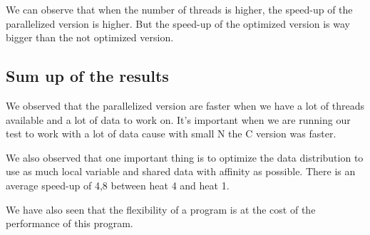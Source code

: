 \documentclass{report}
\begin{document}
We can observe that when the number of threads is higher, the speed-up of the parallelized version is higher. But the speed-up of the optimized version is way bigger than the not optimized version.

\subsection{Sum up of the results}

We observed that the parallelized version are faster when we have a lot of threads available and a lot of data to work on. It's important when we are running our test to work with a lot of data cause with small N the C version was faster. 

We also observed that one important thing is to optimize the data distribution to use as much local variable and shared data with affinity as possible. There is an average speed-up of 4,8 between heat 4 and heat 1.

We have also seen that the flexibility of a program is at the cost of the performance of this program.

\listoffigures
\end{document}
